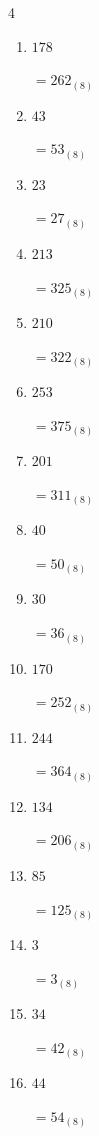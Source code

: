 \begin{multicols}{4}
\begin{enumerate}
        $=206_{(8)}$

  \item $178$

        $=262_{(8)}$

  \item $43$

        $=53_{(8)}$

  \item $23$

        $=27_{(8)}$

  \item $213$

        $=325_{(8)}$

  \item $210$

        $=322_{(8)}$

  \item $253$

        $=375_{(8)}$

  \item $201$

        $=311_{(8)}$

  \item $40$

        $=50_{(8)}$

  \item $30$

        $=36_{(8)}$

\columnbreak %

  \item $170$

        $=252_{(8)}$

  \item $244$

        $=364_{(8)}$

  \item $134$

        $=206_{(8)}$

  \item $85$

        $=125_{(8)}$

  \item $3$

        $=3_{(8)}$

  \item $34$

        $=42_{(8)}$

  \item $44$

        $=54_{(8)}$


\end{enumerate}
\end{multicols}
